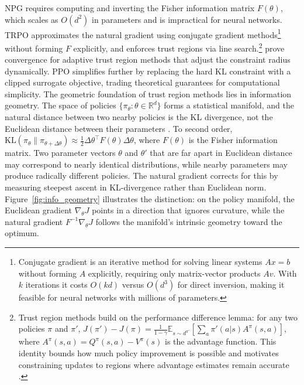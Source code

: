 NPG requires computing and inverting the Fisher information matrix $F(\theta)$, which scales as $O(d^2)$ in parameters and is impractical for neural networks. TRPO \citep{Schulman2015} approximates the natural gradient using conjugate gradient methods\footnote{Conjugate gradient is an iterative method for solving linear systems $Ax = b$ without forming $A$ explicitly, requiring only matrix-vector products $Av$. With $k$ iterations it costs $O(kd)$ versus $O(d^3)$ for direct inversion, making it feasible for neural networks with millions of parameters.} without forming $F$ explicitly, and enforces trust regions via line search.\footnote{Trust region methods build on the performance difference lemma: for any two policies $\pi$ and $\pi'$, $J(\pi') - J(\pi) = \frac{1}{1-\gamma} \mathbb{E}_{s \sim d^{\pi'}} [ \sum_a \pi'(a|s) A^\pi(s,a) ]$, where $A^\pi(s,a) = Q^\pi(s,a) - V^\pi(s)$ is the advantage function. This identity bounds how much policy improvement is possible and motivates constraining updates to regions where advantage estimates remain accurate \citep{Kakade2002}.} \citet{shani2020} prove convergence for adaptive trust region methods that adjust the constraint radius dynamically. PPO \citep{Schulman2017} simplifies further by replacing the hard KL constraint with a clipped surrogate objective, trading theoretical guarantees for computational simplicity.
The geometric foundation of trust region methods lies in information geometry. The space of policies $\{\pi_\theta : \theta \in \mathbb{R}^d\}$ forms a statistical manifold, and the natural distance between two nearby policies is the KL divergence, not the Euclidean distance between their parameters \citep{amari1998natural}. To second order, $\mathrm{KL}(\pi_\theta \| \pi_{\theta + \Delta\theta}) \approx \frac{1}{2} \Delta\theta^\top F(\theta) \Delta\theta$, where $F(\theta)$ is the Fisher information matrix. Two parameter vectors $\theta$ and $\theta'$ that are far apart in Euclidean distance may correspond to nearly identical distributions, while nearby parameters may produce radically different policies. The natural gradient corrects for this by measuring steepest ascent in KL-divergence rather than Euclidean norm. Figure~\ref{fig:info_geometry} illustrates the distinction: on the policy manifold, the Euclidean gradient $\nabla_\theta J$ points in a direction that ignores curvature, while the natural gradient $F^{-1} \nabla_\theta J$ follows the manifold's intrinsic geometry toward the optimum.


